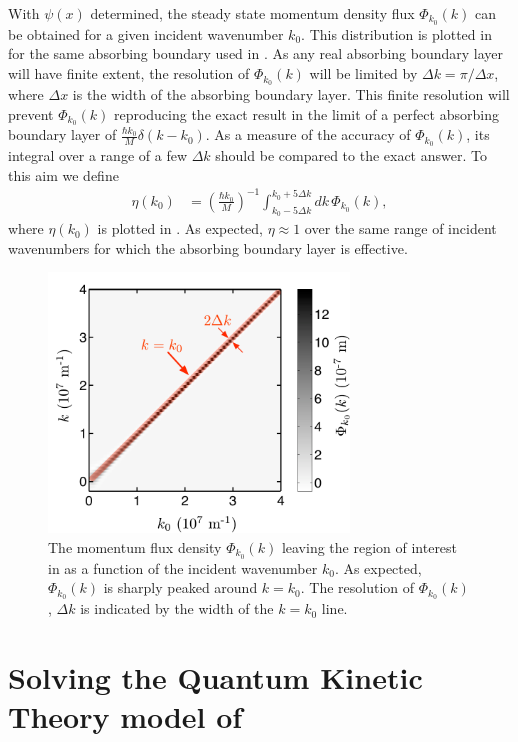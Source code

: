 With $\psi(x)$ determined, the steady state momentum density flux $\Phi_{k_0}(k)$ can be obtained for a given incident wavenumber $k_0$. This distribution is plotted in  for the same absorbing boundary used in . As any real absorbing boundary layer will have finite extent, the resolution of $\Phi_{k_0}(k)$ will be limited by $\Delta k = \pi/\Delta x$, where $\Delta x$ is the width of the absorbing boundary layer. This finite resolution will prevent $\Phi_{k_0}(k)$ reproducing the exact result in the limit of a perfect absorbing boundary layer of $\displaystyle \frac{\hbar k_0}{M}\delta(k - k_0)$. As a measure of the accuracy of $\Phi_{k_0}(k)$, its integral over a range of a few $\Delta k$ should be compared to the exact answer. To this aim we define
\begin{align}
    \eta(k_0) &= \left(\frac{\hbar k_0}{M}\right)^{-1} \int_{k_0-5\Delta k}^{k_0 + 5\Delta k} dk\, \Phi_{k_0}(k),
\end{align}
where $\eta(k_0)$ is plotted in . As expected, $\eta \approx 1$ over the same range of incident wavenumbers for which the absorbing boundary layer is effective.

\begin{figure}
    \centering
    \includegraphics[width=8cm]{PhiAccuracy}
    \caption{\label{MethodsAppendix:PhiAccuracy} The momentum flux density $\Phi_{k_0}(k)$ leaving the region of interest in  as a function of the incident wavenumber $k_0$. As expected, $\Phi_{k_0}(k)$ is sharply peaked around $k=k_0$. The resolution of $\Phi_{k_0}(k)$, $\Delta k$ is indicated by the width of the $k=k_0$ line.}
\end{figure}

\section[Solving the Quantum Kinetic Theory model]{Solving the Quantum Kinetic Theory model of }
\label{MethodsAppendix:KineticTheory}


